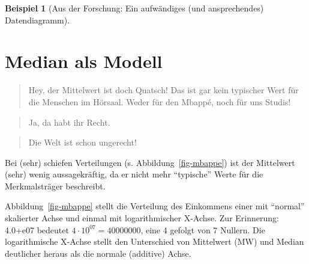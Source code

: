 \documentclass[
  a4paper,
]{scrbook}
\theoremstyle{definition}
\newtheorem{example}{Beispiel}[chapter]
\theoremstyle{definition}
\theoremstyle{definition}
\theoremstyle{remark}
\begin{document}
\begin{example}[Aus der Forschung: Ein aufwändiges (und ansprechendes)
Datendiagramm]
\section{Median als Modell}\label{sec-median}

\begin{quote}
{} Hey, der Mittelwert ist doch Quatsch! Das ist gar kein
typischer Wert für die Menschen im Hörsaal. Weder für den Mbappé, noch
für uns Studis!
\end{quote}

\begin{quote}
{} Ja, da habt ihr Recht.
\end{quote}

\begin{quote}
{} Die Welt ist schon ungerecht!
\end{quote}

\begin{tcolorbox}[enhanced jigsaw, colbacktitle=quarto-callout-important-color!10!white, bottomrule=.15mm, left=2mm, breakable, rightrule=.15mm, coltitle=black, title=\textcolor{quarto-callout-important-color}{\faExclamation}\hspace{0.5em}{Wichtig}, colback=white, leftrule=.75mm, titlerule=0mm, opacityback=0, bottomtitle=1mm, toprule=.15mm, arc=.35mm, toptitle=1mm, opacitybacktitle=0.6, colframe=quarto-callout-important-color-frame]

Bei (sehr) schiefen Verteilungen (s. Abbildung~\ref{fig-mbappe}) ist der
Mittelwert (sehr) wenig aussagekräftig, da er nicht mehr ``typische''
Werte für die Merkmalsträger beschreibt.

\end{tcolorbox}

Abbildung~\ref{fig-mbappe} stellt die Verteilung des Einkommens einer
mit ``normal'' skalierter Achse und einmal mit logarithmischer X-Achse.
Zur Erinnerung: 4.0+e07 bedeutet \(4 \cdot 10^{07} = 40000000\), eine 4
gefolgt von 7 Nullern. Die logarithmische X-Achse stellt den Unterschied
von Mittelwert (MW) und Median deutlicher heraus als die normale
(additive) Achse.

\begin{figure}

\begin{minipage}{\linewidth}

\end{minipage}
\end{figure}
\end{example}
\end{document}
